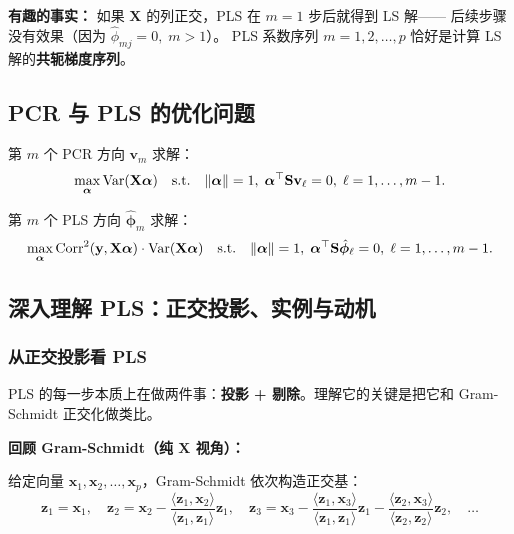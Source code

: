 \textbf{有趣的事实：} 如果 $\mathbf{X}$ 的列正交，PLS 在 $m=1$ 步后就得到 LS 解——
后续步骤没有效果（因为 $\hat{\phi}_{mj}=0,\; m>1$）。
PLS 系数序列 $m=1,2,\dots,p$ 恰好是计算 LS 解的\textbf{共轭梯度序列}。

\subsection{PCR 与 PLS 的优化问题}

第 $m$ 个 PCR 方向 $\mathbf{v}_m$ 求解：
\begin{equation}
    \max_{\bm{\alpha}} \mathrm{Var}(\mathbf{X}\bm{\alpha})
    \quad \text{s.t.} \quad \|\bm{\alpha}\|=1,\; \bm{\alpha}^\top \mathbf{S} \mathbf{v}_\ell = 0,\; \ell=1,\dots,m-1.
\end{equation}

第 $m$ 个 PLS 方向 $\hat{\bm{\phi}}_m$ 求解：
\begin{equation}
    \max_{\bm{\alpha}} \mathrm{Corr}^2(\mathbf{y}, \mathbf{X}\bm{\alpha}) \cdot \mathrm{Var}(\mathbf{X}\bm{\alpha})
    \quad \text{s.t.} \quad \|\bm{\alpha}\|=1,\; \bm{\alpha}^\top \mathbf{S} \hat{\bm{\phi}}_\ell = 0,\; \ell=1,\dots,m-1.
\end{equation}

\subsection{深入理解 PLS：正交投影、实例与动机}

\subsubsection{从正交投影看 PLS}

PLS 的每一步本质上在做两件事：\textbf{投影 + 剔除}。理解它的关键是把它和 Gram-Schmidt 正交化做类比。

\medskip
\noindent
\textbf{回顾 Gram-Schmidt（纯 $\mathbf{X}$ 视角）：}

给定向量 $\mathbf{x}_1, \mathbf{x}_2, \dots, \mathbf{x}_p$，Gram-Schmidt 依次构造正交基：
\[
\mathbf{z}_1 = \mathbf{x}_1,\quad
\mathbf{z}_2 = \mathbf{x}_2 - \frac{\langle \mathbf{z}_1, \mathbf{x}_2 \rangle}{\langle \mathbf{z}_1, \mathbf{z}_1 \rangle}\mathbf{z}_1,\quad
\mathbf{z}_3 = \mathbf{x}_3 - \frac{\langle \mathbf{z}_1, \mathbf{x}_3 \rangle}{\langle \mathbf{z}_1, \mathbf{z}_1 \rangle}\mathbf{z}_1
- \frac{\langle \mathbf{z}_2, \mathbf{x}_3 \rangle}{\langle \mathbf{z}_2, \mathbf{z}_2 \rangle}\mathbf{z}_2,\quad \dots
\]

